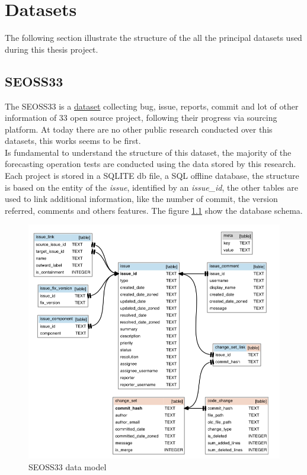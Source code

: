 \documentclass[%
    corpo=12pt,
    twoside,
    oldstyle,
    autoretitolo,
    greek,
    evenboxes,
]{toptesi}
\begin{document}

\chapter{Datasets}
The following section illustrate the structure of the all the principal datasets used during this thesis project.
\section{SEOSS33}
The SEOSS33\cite{SEOSS33} is a \href{https://doi.org/10.7910/DVN/PDDZ4Q}{dataset} collecting bug, issue, reports, commit and lot of other information of 33 open source project, following their progress via sourcing platform. At today there are no other public research conducted over this datasets, this works seems to be first.\\
Is fundamental to understand the structure of this dataset, the majority of the forecasting operation tests are conducted using the data stored by this research.\\
Each project is stored in a SQLITE db file, a SQL offline database, the structure is based on the entity of the \textit{issue}, identified by an \textit{issue\_id}, the other tables are used to link additional information, like the number of commit, the version referred, comments and others features. The figure \ref{fig:seoss33_db} show the database schema.

\begin{figure}[!h]
  \includegraphics[width=\linewidth]{figure/seoss33_db_schema.png}
  \caption{SEOSS33 data model}
  \label{fig:seoss33_db}
\end{figure}
\end{document}
